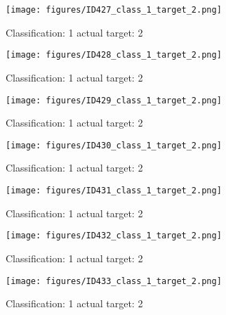 \begin{figure}[h!]
\begin{center}
\texttt{[image: figures/ID427\_class\_1\_target\_2.png]}
\end{center}
\caption{ Classification: 1 actual target: 2}
\label{fig:ID427_class_1_target_2}
\end{figure}
\begin{figure}[h!]
\begin{center}
\texttt{[image: figures/ID428\_class\_1\_target\_2.png]}
\end{center}
\caption{ Classification: 1 actual target: 2}
\label{fig:ID428_class_1_target_2}
\end{figure}
\begin{figure}[h!]
\begin{center}
\texttt{[image: figures/ID429\_class\_1\_target\_2.png]}
\end{center}
\caption{ Classification: 1 actual target: 2}
\label{fig:ID429_class_1_target_2}
\end{figure}
\begin{figure}[h!]
\begin{center}
\texttt{[image: figures/ID430\_class\_1\_target\_2.png]}
\end{center}
\caption{ Classification: 1 actual target: 2}
\label{fig:ID430_class_1_target_2}
\end{figure}
\begin{figure}[h!]
\begin{center}
\texttt{[image: figures/ID431\_class\_1\_target\_2.png]}
\end{center}
\caption{ Classification: 1 actual target: 2}
\label{fig:ID431_class_1_target_2}
\end{figure}
\begin{figure}[h!]
\begin{center}
\texttt{[image: figures/ID432\_class\_1\_target\_2.png]}
\end{center}
\caption{ Classification: 1 actual target: 2}
\label{fig:ID432_class_1_target_2}
\end{figure}
\begin{figure}[h!]
\begin{center}
\texttt{[image: figures/ID433\_class\_1\_target\_2.png]}
\end{center}
\caption{ Classification: 1 actual target: 2}
\label{fig:ID433_class_1_target_2}
\end{figure}
